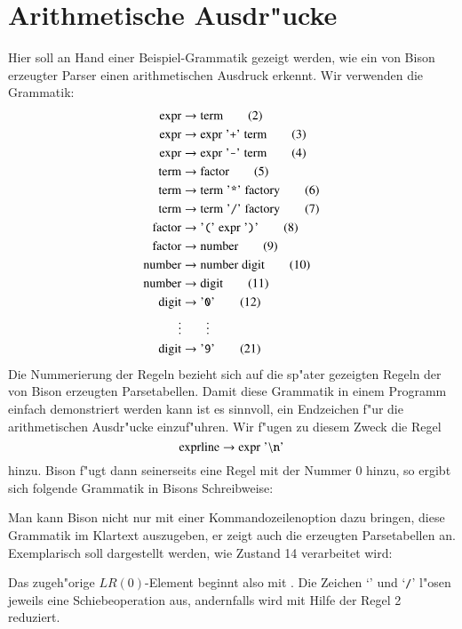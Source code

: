 \section{Arithmetische Ausdr"ucke}
Hier soll an Hand einer Beispiel-Grammatik gezeigt werden, wie ein 
von Bison erzeugter Parser einen arithmetischen Ausdruck
erkennt. Wir verwenden die Grammatik:
\begin{align}
\text{expr}&\rightarrow \text{term}\tag{2}\\
\text{expr}&\rightarrow \text{expr}\;\text{'{\tt +}'}\;\text{term}\tag{3}\\
\text{expr}&\rightarrow \text{expr}\;\text{'{\tt -}'}\;\text{term}\tag{4}\\
\text{term}&\rightarrow \text{factor}\tag{5}\\
\text{term}&\rightarrow \text{term}\;\text{'{\tt *}'}\;\text{factory}\tag{6}\\
\text{term}&\rightarrow \text{term}\;\text{'{\tt /}'}\;\text{factory}\tag{7}\\
\text{factor}&\rightarrow\text{'{\tt (}'}\;\text{expr}\;\text{'{\tt )}'}\tag{8}\\
\text{factor}&\rightarrow\text{number}\tag{9}\\
\text{number}&\rightarrow\text{number}\;\text{digit}\tag{10}\\
\text{number}&\rightarrow\text{digit}\tag{11}\\
\text{digit}&\rightarrow\text{'{\tt 0}'}\tag{12}\\
\vdots&\qquad\vdots\notag\\
\text{digit}&\rightarrow\text{'{\tt 9}'}\tag{21}
\end{align}
Die Nummerierung der Regeln bezieht sich auf die sp"ater gezeigten Regeln
der von Bison erzeugten Parsetabellen. Damit diese Grammatik in einem
Programm einfach demonstriert werden kann ist es sinnvoll, ein Endzeichen
f"ur die arithmetischen Ausdr"ucke einzuf"uhren. Wir f"ugen zu diesem
Zweck die Regel 
\[
\text{exprline}\rightarrow \text{expr}\;\text{'{\tt $\setminus$n}'}
\]
hinzu. Bison f"ugt dann seinerseits eine Regel mit der Nummer 0 hinzu, so ergibt
sich folgende Grammatik in Bisons Schreibweise:

Man kann Bison nicht nur mit einer Kommandozeilenoption dazu bringen, diese
Grammatik im Klartext auszugeben, er zeigt auch die erzeugten Parsetabellen
an. Exemplarisch soll dargestellt werden, wie Zustand 14 verarbeitet
wird:

Das zugeh"orige $LR(0)$-Element beginnt also mit . Die Zeichen
`{\tt *}' und `{\tt /}' l"osen jeweils eine Schiebeoperation aus, andernfalls
wird mit Hilfe der Regel 2 reduziert.

